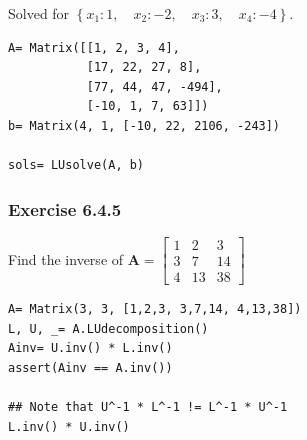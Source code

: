 Solved for $\left \{ x_{1} : 1, \quad x_{2} : -2, \quad x_{3} : 3, \quad x_{4} : -4\right \}$.

\begin{verbatim}
A= Matrix([[1, 2, 3, 4],
           [17, 22, 27, 8],
           [77, 44, 47, -494],
           [-10, 1, 7, 63]])
b= Matrix(4, 1, [-10, 22, 2106, -243])

sols= LUsolve(A, b)
\end{verbatim}

\subsubsection{Exercise 6.4.5}

Find the inverse of $\mathbf{A}= \left[\begin{matrix}1 & 2 & 3\\3 & 7 & 14\\4 & 13 & 38\end{matrix}\right]$

\begin{verbatim}
A= Matrix(3, 3, [1,2,3, 3,7,14, 4,13,38])
L, U, _= A.LUdecomposition()
Ainv= U.inv() * L.inv()
assert(Ainv == A.inv())

## Note that U^-1 * L^-1 != L^-1 * U^-1
L.inv() * U.inv()
\end{verbatim}